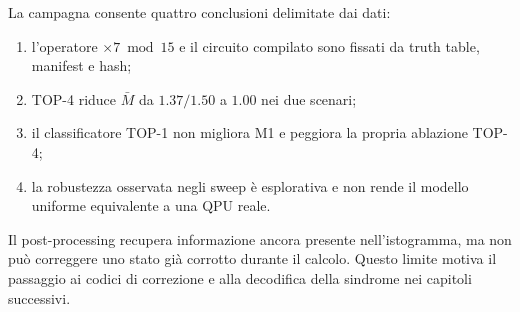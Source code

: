 \begin{onehalfspace}
La campagna consente quattro conclusioni delimitate dai dati:
\begin{enumerate}
    \item l'operatore $\times7\bmod15$ e il circuito compilato sono
    fissati da truth table, manifest e hash;
    \item TOP-4 riduce $\bar M$ da $1.37/1.50$ a $1.00$ nei due scenari;
    \item il classificatore TOP-1 non migliora M1 e peggiora la propria
    ablazione TOP-4;
    \item la robustezza osservata negli sweep è esplorativa e non rende
    il modello uniforme equivalente a una QPU reale.
\end{enumerate}

Il post-processing recupera informazione ancora presente
nell'istogramma, ma non può correggere uno stato già corrotto durante il
calcolo. Questo limite motiva il passaggio ai codici di correzione e alla
decodifica della sindrome nei capitoli successivi.

\end{onehalfspace}
